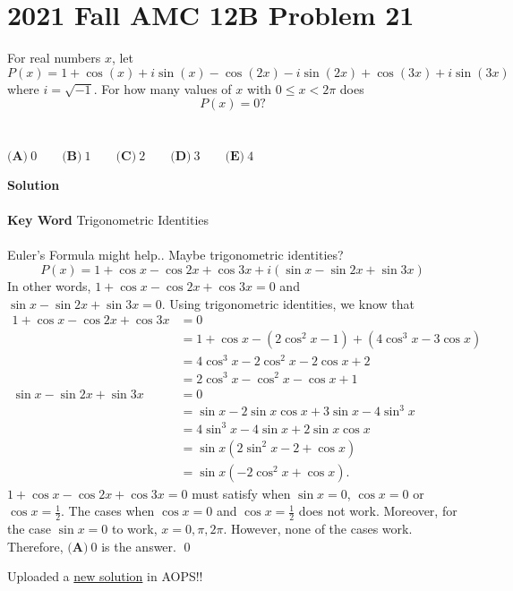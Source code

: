 \documentclass{article}
\newenvironment{solution}{\begin{trivlist}\item[]{\bf Solution}}{\qed \end{trivlist}}
\begin{document}
\section*{2021 Fall AMC 12B Problem 21}
For real numbers $x$, let
\[
P(x) = 1 + \cos(x) + i\sin(x) - \cos(2x) - i\sin(2x) + \cos(3x) + i\sin(3x)
\]
where $i = \sqrt{-1}$. For how many values of $x$ with $0\leq x<2\pi$ does\[P(x)=0?\]
\\\\
$\textbf{(A)}\ 0 \qquad \textbf{(B)}\  1 \qquad \textbf{(C)}\  2 \qquad \textbf{(D)}\ 3 \qquad\textbf{(E)}\ 4$
\begin{solution}
\\\\
\textbf{Key Word} Trigonometric Identities
\\\\
Euler's Formula might help.. Maybe trigonometric identities?
\[
P(x) = 1 + \cos{x} - \cos2x + \cos3x + i(\sin{x} - \sin2x + \sin3x)
\]
In other words, $1 + \cos{x} - \cos2x + \cos3x = 0$ and $\sin{x} - \sin2x + \sin3x = 0$. Using trigonometric identities, we know that
\begin{align*}
    1 + \cos{x} - \cos2x + \cos3x
    &= 0 \\
    &= 1 + \cos{x} - (2\cos^2x - 1) + (4\cos^3x - 3\cos{x}) \\
    &= 4\cos^3x - 2\cos^2x - 2\cos{x} + 2 \\
    &= 2\cos^3x - \cos^2x - \cos{x} + 1 \\
    \sin{x} - \sin2x + \sin3x
    &= 0 \\
    &= \sin{x} - 2\sin{x}\cos{x} + 3\sin{x} - 4\sin^3x \\
    &= 4\sin^3x - 4\sin{x} + 2\sin{x}\cos{x} \\
    &= \sin{x}(2\sin^2x - 2 + \cos{x}) \\
    &= \sin{x}(-2\cos^2x + \cos{x}).
\end{align*}
$1 + \cos{x} - \cos2x + \cos3x = 0$ must satisfy when $\sin{x} = 0$, $\cos{x} = 0$ or $\cos{x} = \frac{1}{2}$. The cases when $\cos{x} = 0$ and $\cos{x} = \frac{1}{2}$ does not work. Moreover, for the case $\sin{x} = 0$ to work, $x = 0, \pi, 2\pi$. However, none of the cases work. Therefore, $\boxed{\textbf{(A)}\ 0}$ is the answer.
\end{solution}
Uploaded a \href{https://artofproblemsolving.com/wiki/index.php/2021_Fall_AMC_12B_Problems/Problem_21#Solution_6_.28Trig.29}{new solution} in AOPS!! \\
\end{document}

